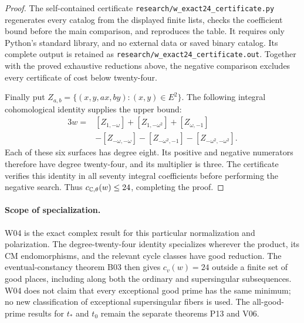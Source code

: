 \begin{proof}
The self-contained certificate \texttt{research/w\_exact24\_certificate.py} regenerates every catalog from the displayed finite lists, checks the coefficient bound before the main comparison, and reproduces the table. It requires only Python's standard library, and no external data or saved binary catalog. Its complete output is retained as \texttt{research/w\_exact24\_certificate.out}. Together with the proved exhaustive reductions above, the negative comparison excludes every certificate of cost below twenty-four.

Finally put $Z_{a,b}=\{(x,y,ax,by):(x,y)\in E^2\}$. The following integral cohomological identity supplies the upper bound:
\begin{align*}
3w={}&[Z_{1,-\omega}]+[Z_{1,-\omega^2}]+[Z_{\omega,-1}]\\
&-[Z_{-\omega,-\omega}]-[Z_{-\omega^2,-1}]-[Z_{-\omega^2,-\omega^2}].
\end{align*}
Each of these six surfaces has degree eight. Its positive and negative numerators therefore have degree twenty-four, and its multiplier is three. The certificate verifies this identity in all seventy integral coefficients before performing the negative search. Thus $c_{\mathbb C,\theta}(w)\leq24$, completing the proof.
\end{proof}

\paragraph{Scope of specialization.}
W04 is the exact complex result for this particular normalization and polarization. The degree-twenty-four identity specializes wherever the product, its CM endomorphisms, and the relevant cycle classes have good reduction. The eventual-constancy theorem B03 then gives $c_v(w)=24$ outside a finite set of good places, including along both the ordinary and supersingular subsequences. W04 does not claim that every exceptional good prime has the same minimum; no new classification of exceptional supersingular fibers is used. The all-good-prime results for $t_*$ and $t_0$ remain the separate theorems P13 and V06.
